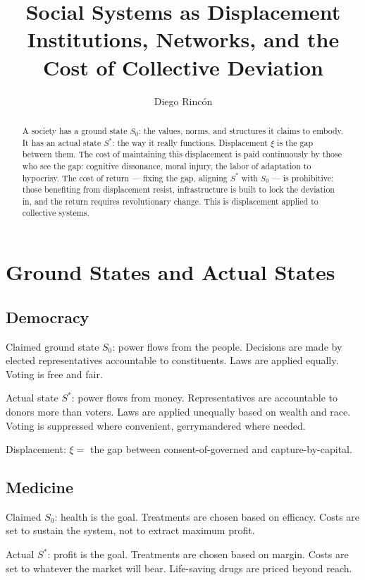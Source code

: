 \documentclass[12pt]{article}
\title{Social Systems as Displacement\\
Institutions, Networks, and the Cost of Collective Deviation}
\author{Diego Rincón}
\date{}
\begin{document}
\maketitle

\begin{abstract}
A society has a ground state $S_0$: the values, norms, and structures it claims to embody. It has an actual state $S^*$: the way it really functions. Displacement $\xi$ is the gap between them. The cost of maintaining this displacement is paid continuously by those who see the gap: cognitive dissonance, moral injury, the labor of adaptation to hypocrisy. The cost of return — fixing the gap, aligning $S^*$ with $S_0$ — is prohibitive: those benefiting from displacement resist, infrastructure is built to lock the deviation in, and the return requires revolutionary change. This is displacement applied to collective systems.
\end{abstract}

\section{Ground States and Actual States}

\subsection{Democracy}

Claimed ground state $S_0$: power flows from the people. Decisions are made by elected representatives accountable to constituents. Laws are applied equally. Voting is free and fair.

Actual state $S^*$: power flows from money. Representatives are accountable to donors more than voters. Laws are applied unequally based on wealth and race. Voting is suppressed where convenient, gerrymandered where needed.

Displacement: $\xi = $ the gap between consent-of-governed and capture-by-capital.

\subsection{Medicine}

Claimed $S_0$: health is the goal. Treatments are chosen based on efficacy. Costs are set to sustain the system, not to extract maximum profit.

Actual $S^*$: profit is the goal. Treatments are chosen based on margin. Costs are set to whatever the market will bear. Life-saving drugs are priced beyond reach.
\end{document}
